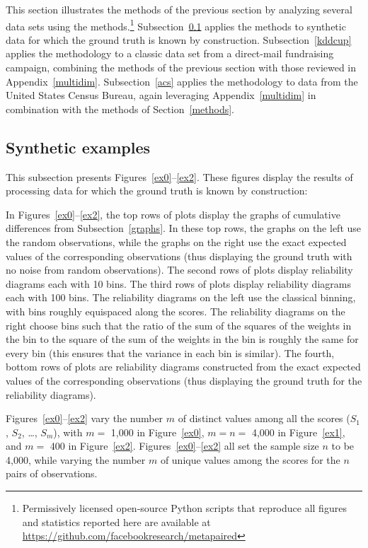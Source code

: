 \documentclass[]{fairmeta}
\begin{document}
This section illustrates the methods of the previous section
by analyzing several data sets using the methods.\footnote{Permissively
licensed open-source Python scripts that reproduce all figures and statistics
reported here are available at
\url{https://github.com/facebookresearch/metapaired}}
Subsection~\ref{synthetic} applies the methods to synthetic data
for which the ground truth is known by construction.
Subsection~\ref{kddcup} applies the methodology to a classic data set
from a direct-mail fundraising campaign, combining the methods
of the previous section with those reviewed in Appendix~\ref{multidim}.
Subsection~\ref{acs} applies the methodology to data
from the United States Census Bureau, again leveraging Appendix~\ref{multidim}
in combination with the methods of Section~\ref{methods}.


\subsection{Synthetic examples}
\label{synthetic}

This subsection presents Figures~\ref{ex0}--\ref{ex2}.
These figures display the results of processing data for which the ground truth
is known by construction:

In Figures~\ref{ex0}--\ref{ex2}, the top rows of plots
display the graphs of cumulative differences from Subsection~\ref{graphs}.
In these top rows, the graphs on the left use the random observations,
while the graphs on the right use the exact expected values
of the corresponding observations (thus displaying the ground truth
with no noise from random observations).
The second rows of plots display reliability diagrams each with 10 bins.
The third rows of plots display reliability diagrams each with 100 bins.
The reliability diagrams on the left use the classical binning,
with bins roughly equispaced along the scores.
The reliability diagrams on the right choose bins such that the ratio
of the sum of the squares of the weights in the bin
to the square of the sum of the weights in the bin
is roughly the same for every bin (this ensures that the variance
in each bin is similar).
The fourth, bottom rows of plots are reliability diagrams
constructed from the exact expected values of the corresponding observations
(thus displaying the ground truth for the reliability diagrams).

Figures~\ref{ex0}--\ref{ex2} vary the number $m$ of distinct values
among all the scores ($S_1$, $S_2$, \dots, $S_m$), with $m =$ 1,000
in Figure~\ref{ex0}, $m = n =$ 4,000 in Figure~\ref{ex1},
and $m =$ 400 in Figure~\ref{ex2}. Figures~\ref{ex0}--\ref{ex2}
all set the sample size $n$ to be 4,000, while varying the number $m$
of unique values among the scores for the $n$ pairs of observations.
\end{document}
